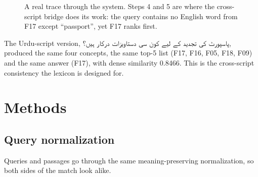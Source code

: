 \documentclass[11pt,a4paper]{article}
\newcommand{\ur}[1]{{\urdufont\beginR #1\endR}}
\newcommand{\stamp}[2]{\tikz[baseline=-0.6ex]{\node[draw=#1, line width=1.1pt, rounded corners=3pt, inner sep=3pt, rotate=-4,
  font=\sffamily\bfseries\scriptsize, text=#1] {\uppercase{#2}};}}
\begin{document}
\begin{figure}[H]
\caption{A real trace through the system. Steps 4 and 5 are where the cross-script bridge does its work: the query contains no
English word from F17 except ``passport'', yet F17 ranks first.}
\label{fig:journey}
\end{figure}

\begin{notebox}
The Urdu-script version, \ur{پاسپورٹ کی تجدید کے لیے کون سی دستاویزات درکار ہیں؟}, produced the same four concepts, the same
top-5 list (F17, F16, F05, F18, F09) and the same answer (F17), with dense similarity 0.8466. This is the cross-script
consistency the lexicon is designed for.
\end{notebox}

\section{Methods}
\label{sec:methods}

\subsection{Query normalization}
\label{sec:norm}
Queries and passages go through the same meaning-preserving normalization, so both sides of the match look alike.
\end{document}
